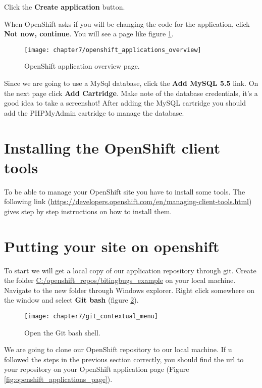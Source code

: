 Click the \textbf{Create application} button.

When OpenShift asks if you will be changing the code for the application, click \textbf{Not now, continue}. You will see a page like figure \ref{fig:openshift_applications_overview}.

\begin{figure}[H]
	\centering
	\texttt{[image: chapter7/openshift\_applications\_overview]}
	\caption{OpenShift application overview page.}
	\label{fig:openshift_applications_overview}
\end{figure}

Since we are going to use a MySql database, click the \textbf{Add MySQL 5.5} link. On the next page click \textbf{Add Cartridge}. Make note of the database credentials, it's a good idea to take a screenshot! After adding the MySQL cartridge you should add the PHPMyAdmin cartridge to manage the database.

\section{Installing the OpenShift client tools}

To be able to manage your OpenShift site you have to install some tools. The following link (\url{https://developers.openshift.com/en/managing-client-tools.html}) gives step by step instructions on how to install them.

\section{Putting your site on openshift}

To start we will get a local copy of our application repository through git. Create the folder \url{C:/openshift_repos/bitingbugs_example} on your local machine. Navigate to the new folder through Windows explorer. Right click somewhere on the window and select \textbf{Git bash} (figure \ref{fig:git_contextual_menu}).  

\begin{figure}[H]
	\centering
	\texttt{[image: chapter7/git\_contextual\_menu]}
	\caption{Open the Git bash shell.}
	\label{fig:git_contextual_menu}
\end{figure}

We are going to clone our OpenShift repository to our local machine. If u followed the steps in the previous section correctly, you should find the url to your repository on your OpenShift application page (Figure \ref{fig:openshift_applications_page}).

